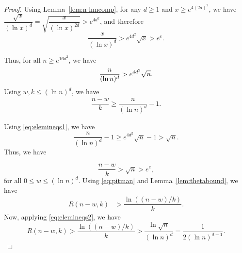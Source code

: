 \documentclass{amsart}
\begin{document}
\begin{proof}
Using Lemma~\ref{lem:n-lnncomp}, for any $d\geq 1$ and $x\geq e^{4(2d)^{2}}$, we have $\dfrac{\sqrt{x}}{(\ln x)^{d}}=\sqrt{\dfrac{x}{(\ln x)^{2d}}}>e^{4d^{2}}$, and therefore 
\[\dfrac{x}{(\ln x)^{d}} > e^{4d^{2}}\sqrt{x}>e^{e}.\]

Thus, for all $n\geq e^{16d^{2}}$, we have
\begin{equation}\label{eq:elemineqs1}
\dfrac{n}{(\ln n)^{d}}> e^{4d^{2}}\sqrt{n}. \\
\end{equation}
Using $w,k\leq (\ln n)^{d}$, we have 
\begin{align*}
\dfrac{n-w}{k} \geq \dfrac{n}{(\ln n)^{d}}-1.
\end{align*}

Using \eqref{eq:elemineqs1}, we have 
\[\dfrac{n}{(\ln n)^{d}}-1 \geq e^{4d^{2}}\sqrt{n}-1  > \sqrt{n}.\] Thus, we have 

\begin{equation}\label{eq:elemineqs2}
\dfrac{n-w}{k}> \sqrt{n} >e^{e},
\end{equation}
for all $0\leq w\leq (\ln n)^{d}$.
Using \eqref{eq:pitman} and Lemma~\ref{lem:thetabound}, we have 
\begin{align*}
R(n-w,k) &> \dfrac{\ln((n-w)/k)}{k}.
\end{align*} Now, applying \eqref{eq:elemineqs2}, we have
\[R(n-w,k) > \dfrac{\ln((n-w)/k)}{k} > \dfrac{\ln \sqrt{n}}{(\ln n)^d} = \dfrac{1}{2(\ln n)^{d-1}}.\]
\end{proof}
\end{document}
